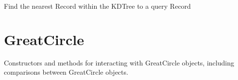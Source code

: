\documentclass[letterpaper,10pt,english]{sphinxmanual}
\begin{document}
\begin{fulllineitems}
\begin{fulllineitems}
\label{\detokenize{users_guide:GeoSpatialTools.kdtree.KDTree.query}}
\pysigstartsignatures
\pysiglinewithargsret
{}
{}
{}
\pysigstopsignatures
\sphinxAtStartPar
Find the nearest Record within the KDTree to a query Record
\begin{quote}\begin{description}
\sphinxAtStartPar
{}

\end{description}\end{quote}

\end{fulllineitems}


\end{fulllineitems}


\section{GreatCircle}
\label{\detokenize{users_guide:greatcircle}}\label{\detokenize{users_guide:module-GeoSpatialTools.great_circle}}
\sphinxAtStartPar
Constructors and methods for interacting with GreatCircle objects, including
comparisons between GreatCircle objects.
\end{document}
